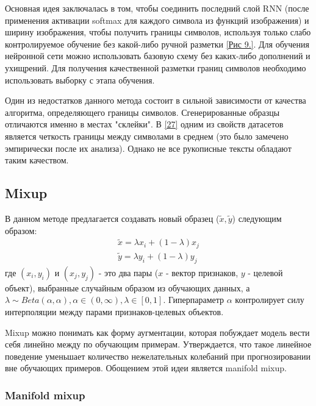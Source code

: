 Основная идея заключалась в том, чтобы соединить последний слой RNN (после применения активации softmax для каждого символа из функций изображения) и ширину изображения, чтобы получить границы символов, используя только слабо контролируемое обучение без какой-либо ручной разметки \hyperlink{image9}{[Рис 9.]}. Для обучения нейронной сети можно использовать базовую схему без каких-либо дополнений и ухищрений. Для получения качественной разметки границ символов необходимо использовать выборку с этапа обучения.

Один из недостатков данного метода состоит в сильной зависимости от качества алгоритма, определяющего границы символов. Сгенерированные образцы отличаются именно в местах "склейки". В \hyperlink{cite.Sho21}{[27]} одним из свойств датасетов является четкость границы между символами в среднем (это было замечено эмпирически после их анализа). Однако не все рукописные тексты обладают таким качеством.

\subsection{Mixup}

В данном методе предлагается создавать новый образец ($\tilde{x}, \tilde{y}$) следующим образом:
\begin{equation}
\begin{split}
\tilde{x} = \lambda x_i + (1 - \lambda) x_j \\
\tilde{y} = \lambda y_i + (1 - \lambda) y_j
\end{split}
\end{equation}
где $(x_i, y_i)$ и $(x_j, y_j)$ - это два пары ($x$ - вектор признаков, $y$ - целевой объект), выбранные случайным образом из обучающих данных, а $\lambda \sim Beta(\alpha, \alpha), \alpha \in (0, \infty), \lambda \in [0, 1]$. Гиперпараметр $\alpha$ контролирует силу интерполяции между парами признаков-целевых объектов.

Mixup можно понимать как форму аугментации, которая побуждает модель вести себя линейно между по обучающим примерам. Утверждается, что такое линейное поведение уменьшает количество нежелательных колебаний при прогнозировании вне обучающих примеров. Обощением этой идеи является manifold mixup.

\newpage

\subsubsection{Manifold mixup}

